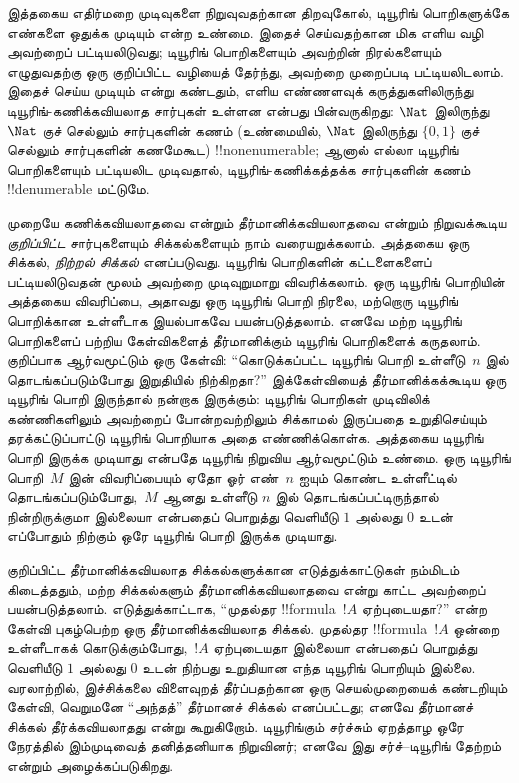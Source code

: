 \documentclass[../../../include/open-logic-section]{subfiles}
\begin{document}
இத்தகைய எதிர்மறை முடிவுகளை நிறுவுவதற்கான திறவுகோல், டியூரிங்
பொறிகளுக்கே எண்களை ஒதுக்க முடியும் என்ற உண்மை. இதைச் செய்வதற்கான
மிக எளிய வழி அவற்றைப் பட்டியலிடுவது; டியூரிங் பொறிகளையும் அவற்றின்
நிரல்களையும் எழுதுவதற்கு ஒரு குறிப்பிட்ட வழியைத் தேர்ந்து, அவற்றை
முறைப்படி பட்டியலிடலாம். இதைச் செய்ய முடியும் என்று கண்டதும்,
எளிய எண்ணளவுக் கருத்துகளிலிருந்து டியூரிங்-கணிக்கவியலாத சார்புகள்
உள்ளன என்பது பின்வருகிறது: $\Nat$ இலிருந்து~$\Nat$ குச் செல்லும்
சார்புகளின் கணம் (உண்மையில், $\Nat$ இலிருந்து $\{0, 1\}$ குச்
செல்லும் சார்புகளின் கணமேகூட) !!{nonenumerable}; ஆனால் எல்லா டியூரிங்
பொறிகளையும் பட்டியலிட முடிவதால், டியூரிங்-கணிக்கத்தக்க சார்புகளின்
கணம் !!{denumerable} மட்டுமே.

முறையே கணிக்கவியலாதவை என்றும் தீர்மானிக்கவியலாதவை என்றும் நிறுவக்கூடிய
\emph{குறிப்பிட்ட} சார்புகளையும் சிக்கல்களையும் நாம் வரையறுக்கலாம்.
அத்தகைய ஒரு சிக்கல், \emph{நிற்றல் சிக்கல்} எனப்படுவது. டியூரிங்
பொறிகளின் கட்டளைகளைப் பட்டியலிடுவதன் மூலம் அவற்றை முடிவுறுமாறு
விவரிக்கலாம். ஒரு டியூரிங் பொறியின் அத்தகைய விவரிப்பை, அதாவது ஒரு
டியூரிங் பொறி நிரலை, மற்றொரு டியூரிங் பொறிக்கான உள்ளீடாக இயல்பாகவே
பயன்படுத்தலாம். எனவே மற்ற டியூரிங் பொறிகளைப் பற்றிய கேள்விகளைத்
தீர்மானிக்கும் டியூரிங் பொறிகளைக் கருதலாம். குறிப்பாக ஆர்வமூட்டும்
ஒரு கேள்வி: ``கொடுக்கப்பட்ட டியூரிங் பொறி உள்ளீடு~$n$ இல்
தொடங்கப்படும்போது இறுதியில் நிற்கிறதா?'' இக்கேள்வியைத் தீர்மானிக்கக்கூடிய
ஒரு டியூரிங் பொறி இருந்தால் நன்றாக இருக்கும்: டியூரிங் பொறிகள்
முடிவிலிக் கண்ணிகளிலும் அவற்றைப் போன்றவற்றிலும் சிக்காமல் இருப்பதை
உறுதிசெய்யும் தரக்கட்டுப்பாட்டு டியூரிங் பொறியாக அதை எண்ணிக்கொள்க.
அத்தகைய டியூரிங் பொறி இருக்க முடியாது என்பதே டியூரிங் நிறுவிய
ஆர்வமூட்டும் உண்மை. ஒரு டியூரிங் பொறி~$M$ இன் விவரிப்பையும் ஏதோ ஓர்
எண்~$n$ ஐயும் கொண்ட உள்ளீட்டில் தொடங்கப்படும்போது,~$M$ ஆனது உள்ளீடு
$n$ இல் தொடங்கப்பட்டிருந்தால் நின்றிருக்குமா இல்லையா என்பதைப் பொறுத்து
வெளியீடு $1$ அல்லது $0$ உடன் எப்போதும் நிற்கும் ஒரே டியூரிங் பொறி
இருக்க முடியாது.

குறிப்பிட்ட தீர்மானிக்கவியலாத சிக்கல்களுக்கான எடுத்துக்காட்டுகள் நம்மிடம்
கிடைத்ததும், மற்ற சிக்கல்களும் தீர்மானிக்கவியலாதவை என்று காட்ட
அவற்றைப் பயன்படுத்தலாம். எடுத்துக்காட்டாக, ``முதல்தர
!!{formula}~$!A$ ஏற்புடையதா?'' என்ற கேள்வி புகழ்பெற்ற ஒரு
தீர்மானிக்கவியலாத சிக்கல். முதல்தர !!{formula}~$!A$ ஒன்றை
உள்ளீடாகக் கொடுக்கும்போது,~$!A$ ஏற்புடையதா இல்லையா என்பதைப் பொறுத்து
வெளியீடு $1$ அல்லது $0$ உடன் நிற்பது உறுதியான எந்த டியூரிங் பொறியும்
இல்லை. வரலாற்றில், இச்சிக்கலை விளைவுறத் தீர்ப்பதற்கான ஒரு
செயல்முறையைக் கண்டறியும் கேள்வி, வெறுமனே ``அந்தத்'' தீர்மானச்
சிக்கல் எனப்பட்டது; எனவே தீர்மானச் சிக்கல் தீர்க்கவியலாதது என்று
கூறுகிறோம். டியூரிங்கும் சர்ச்சும் ஏறத்தாழ ஒரே நேரத்தில் இம்முடிவைத்
தனித்தனியாக நிறுவினர்; எனவே இது சர்ச்--டியூரிங் தேற்றம் என்றும்
அழைக்கப்படுகிறது.
\end{document}
